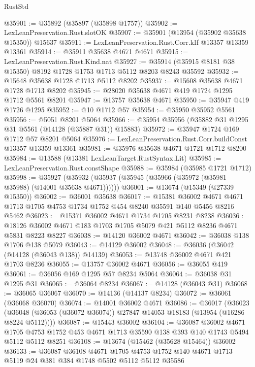 \begin{lexlean}{RustStd}
\begin{coremodule}
@35901 := @35892 (@35897 (@35898 @1757))
@35902 := LexLeanPreservation.Rust.slotOK
@35907 := @35901 (@13954 (@35902 @35638 @15350)) @15637
@35911 := LexLeanPreservation.Rust.Corr.kIf @13357 @13359 @13361
@35914 := @35911 @35638 @4671 @4671
@35915 := LexLeanPreservation.Rust.Kind.nat
@35927 := @35914 (@35915 @8181 @38 @15350) @8192 @1728 @1753 @1713 @5112 @8203 @8243 @35592
@35932 := @15648 @35638 @1728 @1713 @5112 @8202
@35937 := @15608 @35638 @4671 @1728 @1713 @8202
@35945 := @28020 @35638 @4671 @419 @1724 @1295 @1712 @5561 @8201
@35947 := @13757 @35638 @4671
@35950 := @35947 @419 @1726 @1295
@35952 := @10 @1712 @57
@35954 := @35950 @35952 @5561
@35956 := @5051 @8201 @5064
@35966 := @35954 @35956 (@35882 @31 @1295 @31 @5561 (@14128 (@35887 @31)) @15883)
@35972 := @35947 @1724 @169 @1712 @57 @8201 @5064
@35976 := LexLeanPreservation.Rust.Corr.buildConst @13357 @13359 @13361
@35981 := @35976 @35638 @4671 @1721 @1712 @8200
@35984 := @13588 (@13381 LexLeanTarget.RustSyntax.Lit)
@35985 := LexLeanPreservation.Rust.constShape
@35988 := @35984 (@35985 @1721 @1712)
@35998 := @35927 (@35932 (@35937 (@35945 (@35966 (@35972 (@35981 @35988) (@14001 @35638 @4671))))))
@36001 := @13674 (@15349 (@27339 @15350))
@36002 := @36001 @35638
@36017 := @15381
    @36002
    @4671
    @4671
    @1713
    @1705
    @4753
    @1734
    @1752
    @454
    @8240
    @35591
    @140
    @5456
    @8216
    @5462
@36023 := @15371 @36002 @4671 @1734 @1705 @8231 @8238
@36036 := @18126 @36002 @4671 @183 @1703 @1705 @5079 @421 @5112 @8236 @4671 @5831 @8223 @8227
@36038 := @14120 @36002 @4671
@36042 := @36038 @138 @1706 @138 @5079
@36043 := @14129 @36002
@36048 := @36036 (@36042 (@14128 (@36043 @138)) @14139)
@36053 := @13748 @36002 @4671 @421 @1703 @8236
@36055 := @13757 @36002 @4671
@36056 := @36055 @419
@36061 := @36056 @169 @1295 @57 @8234 @5064
@36064 := @36038 @31 @1295 @31
@36065 := @36064 @8234
@36067 := @14128 (@36043 @31)
@36068 := @36065 @36067
@36070 := @14136 (@14137 @8234)
@36072 := @36061 (@36068 @36070)
@36074 := @14001 @36002 @4671
@36086 := @36017
    (@36023 (@36048 (@36053 (@36072 @36074)) @27847 @14053 @18183 (@13954 (@16286 @8224 @5112))))
@36087 := @15443 @36002
@36104 := @36087
    @36002
    @4671
    @1705
    @4753
    @1752
    @453
    @4671
    @1713
    @35590
    @138
    @393
    @140
    @1743
    @5494
    @5112
    @5112
    @8251
@36108 := @13674 (@15462 (@35628 @15464)) @36002
@36133 := @36087
    @36108
    @4671
    @1705
    @4753
    @1752
    @140
    @4671
    @1713
    @5119
    @24
    @381
    @384
    @1748
    @5502
    @5112
    @5112
    @35586

\end{coremodule}
\end{lexlean}

